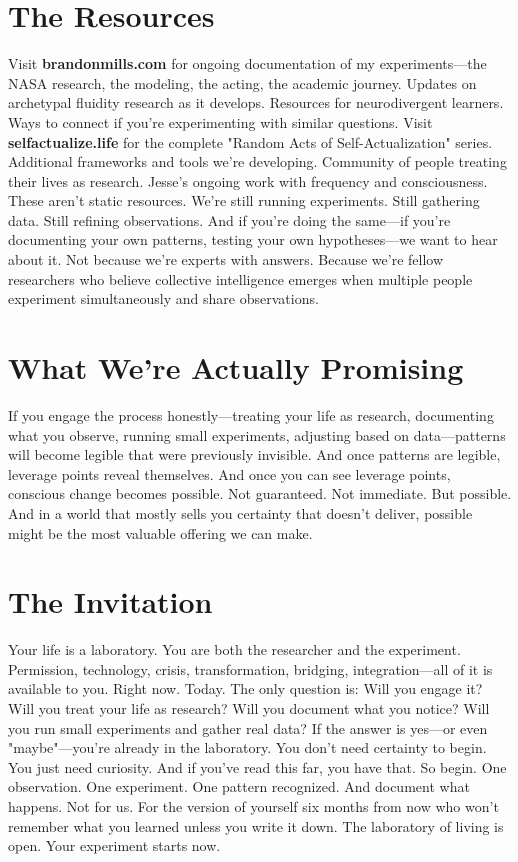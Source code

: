 \documentclass[12pt,openany]{book}
\begin{document}
\section{The Resources}

Visit \textbf{brandonmills.com} for ongoing documentation of my experiments—the NASA research, the modeling, the acting, the academic journey. Updates on archetypal fluidity research as it develops. Resources for neurodivergent learners. Ways to connect if you're experimenting with similar questions.
Visit \textbf{selfactualize.life} for the complete "Random Acts of Self-Actualization" series. Additional frameworks and tools we're developing. Community of people treating their lives as research. Jesse's ongoing work with frequency and consciousness.
These aren't static resources. We're still running experiments. Still gathering data. Still refining observations.
And if you're doing the same—if you're documenting your own patterns, testing your own hypotheses—we want to hear about it.
Not because we're experts with answers. Because we're fellow researchers who believe collective intelligence emerges when multiple people experiment simultaneously and share observations.

\section{What We're Actually Promising}

If you engage the process honestly—treating your life as research, documenting what you observe, running small experiments, adjusting based on data—patterns will become legible that were previously invisible.
And once patterns are legible, leverage points reveal themselves.
And once you can see leverage points, conscious change becomes possible.
Not guaranteed. Not immediate. But possible.
And in a world that mostly sells you certainty that doesn't deliver, possible might be the most valuable offering we can make.

\section{The Invitation}

Your life is a laboratory. You are both the researcher and the experiment.
Permission, technology, crisis, transformation, bridging, integration—all of it is available to you. Right now. Today.
The only question is: Will you engage it?
Will you treat your life as research? Will you document what you notice? Will you run small experiments and gather real data?
If the answer is yes—or even "maybe"—you're already in the laboratory.
You don't need certainty to begin. You just need curiosity. And if you've read this far, you have that.
So begin. One observation. One experiment. One pattern recognized.
And document what happens. Not for us. For the version of yourself six months from now who won't remember what you learned unless you write it down.
The laboratory of living is open.
Your experiment starts now.
\end{document}

